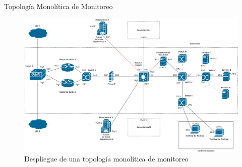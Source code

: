 \begin{subsection}{Topología Monolítica de Monitoreo}
    \begin{figure}[H]
    \centering
    \includegraphics[width=1\textwidth]{./iteracion_1_imagenes/figura_topologia_m_unc.png}
    \caption{Despliegue de una topología monolítica de monitoreo}
    \label{fig:iter1_top_m_unc}
    \end{figure}
    \end{subsection}
    
